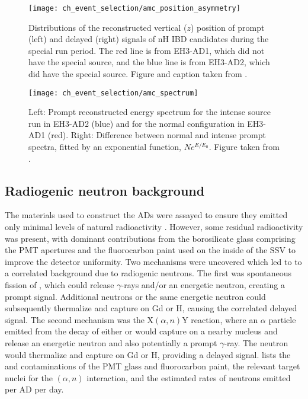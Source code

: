 \begin{figure}
    \centering
    \texttt{[image: ch\_event\_selection/amc\_position\_asymmetry]}
    \caption[Intense \amc{} run vertical positions]{
        Distributions of the reconstructed vertical ($z$) position
        of prompt (left) and delayed (right) signals of nH IBD candidates
        during the special \amc{} run period.
        The red line is from EH3-AD1, which did not have the special \amc{} source,
        and the blue line is from EH3-AD2, which did have the special \amc{} source.
        Figure and caption taken from \cite{nh2016technote}.
    }
    \label{fig:amc_position}
\end{figure}

\begin{figure}
    \centering
    \texttt{[image: ch\_event\_selection/amc\_spectrum]}
    \caption[\amc{} prompt spectrum]{
        Left: Prompt reconstructed energy spectrum
        for the intense \amc{} source run in EH3-AD2 (blue)
        and for the normal configuration in EH3-AD1 (red).
        Right: Difference between normal and intense prompt spectra,
        fitted by an exponential function, $Ne^{E/E_0}$.
        Figure taken from \cite{nh2016technote}.
    }
    \label{fig:amc_spectrum}
\end{figure}

\subsection{Radiogenic neutron background}
\label{subsec:radn}

The materials used to construct the ADs were
assayed to ensure they emitted only minimal levels of natural radioactivity
\cite{sidebyside}.
However, some residual radioactivity was present,
with dominant contributions from the borosilicate glass comprising the PMT apertures
and the fluorocarbon paint \cite{fluorocarbon_paint} used on the inside of the SSV
to improve the detector uniformity.
Two mechanisms were uncovered which led to to a correlated background
due to radiogenic neutrons\cite{rad_n_intro}.
The first was spontaneous fission of ,
which could release $\gamma$-rays and/or an energetic neutron,
creating a prompt signal.
Additional neutrons or the same energetic neutron
could subsequently thermalize and capture on Gd or H,
causing the correlated delayed signal.
The second mechanism was the $\text{X}(\alpha, n)\text{Y}$ reaction,
where an $\alpha$ particle emitted from the decay of
either  or 
would capture on a nearby nucleus
and release an energetic neutron and also potentially a prompt $\gamma$-ray.
The neutron would thermalize and capture on Gd or H, providing a delayed signal.
 lists the  and 
contaminations of the PMT glass and fluorocarbon paint,
the relevant target nuclei for the $(\alpha,n)$ interaction,
and the estimated rates of neutrons emitted per AD per day.


